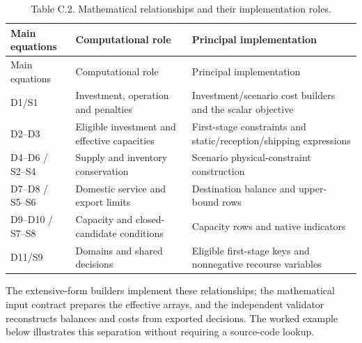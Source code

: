 \documentclass[
  english,
  11pt,
  a4paper,
]{article}
\begin{document}
\begin{longtable}[]{@{}
  >{\raggedright\arraybackslash}p{}
  >{\raggedright\arraybackslash}p{}
  >{\raggedright\arraybackslash}p{}@{}}
\caption{Table C.2. Mathematical relationships and their implementation
roles.}\tabularnewline
\toprule\noalign{}
\begin{minipage}[b]{\linewidth}\raggedright
Main equations
\end{minipage} & \begin{minipage}[b]{\linewidth}\raggedright
Computational role
\end{minipage} & \begin{minipage}[b]{\linewidth}\raggedright
Principal implementation
\end{minipage} \\
\midrule\noalign{}
\endfirsthead
\toprule\noalign{}
\begin{minipage}[b]{\linewidth}\raggedright
Main equations
\end{minipage} & \begin{minipage}[b]{\linewidth}\raggedright
Computational role
\end{minipage} & \begin{minipage}[b]{\linewidth}\raggedright
Principal implementation
\end{minipage} \\
\midrule\noalign{}
\endhead
\bottomrule\noalign{}
\endlastfoot
D1/S1 & Investment, operation and penalties & Investment/scenario cost
builders and the scalar objective \\
D2--D3 & Eligible investment and effective capacities & First-stage
constraints and static/reception/shipping expressions \\
D4--D6 / S2--S4 & Supply and inventory conservation & Scenario
physical-constraint construction \\
D7--D8 / S5--S6 & Domestic service and export limits & Destination
balance and upper-bound rows \\
D9--D10 / S7--S8 & Capacity and closed-candidate conditions & Capacity
rows and native indicators \\
D11/S9 & Domains and shared decisions & Eligible first-stage keys and
nonnegative recourse variables \\
\end{longtable}

The extensive-form builders implement these relationships; the
mathematical input contract prepares the effective arrays, and the
independent validator reconstructs balances and costs from exported
decisions. The worked example below illustrates this separation without
requiring a source-code lookup.
\end{document}
